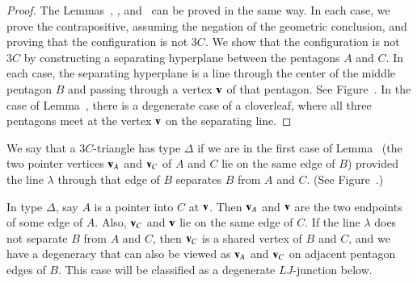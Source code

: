 \begin{proof} The Lemmas~, ,
  and~ can be proved in the same way.  In each case,
  we prove the contrapositive, assuming the negation of the geometric
  conclusion, and proving that the configuration is not $3C$.  We show
  that the configuration is not $3C$ by constructing a separating
  hyperplane between the pentagons $A$ and $C$.  In each case, the
  separating hyperplane is a line through the center of the middle
  pentagon $B$ and passing through a vertex ${\mathbf v}$ of that pentagon.
  See Figure~.  In the case of Lemma~,
  there is a degenerate case of a cloverleaf, where all three
  pentagons meet at the vertex ${\mathbf v}$ on the separating line.
\end{proof}

\begin{definition}[$\Delta$]
  We say that a $3C$-triangle has type $\Delta$ if we are in the first
  case of Lemma~ (the two pointer vertices ${\mathbf v}_A$ and
  ${\mathbf v}_C$ of $A$ and $C$ lie on the same edge of $B$) provided the line
  $\lambda$ through that edge of $B$ separates $B$ from $A$ and
  $C$. (See Figure~.)
\end{definition}



In type $\Delta$, say $A$ is a pointer into $C$ at ${\mathbf v}$.  Then ${\mathbf v}_A$
and ${\mathbf v}$ are the two endpoints of some edge of $A$.  Also, ${\mathbf v}_C$ and
${\mathbf v}$ lie on the same edge of $C$.  If the line $\lambda$ does not
separate $B$ from $A$ and $C$, then ${\mathbf v}_C$ is a shared vertex of $B$
and $C$, and we have a degeneracy that can also be viewed as ${\mathbf v}_A$
and ${\mathbf v}_C$ on adjacent pentagon edges of $B$.  This case will be
classified as a degenerate $LJ$-junction below.

